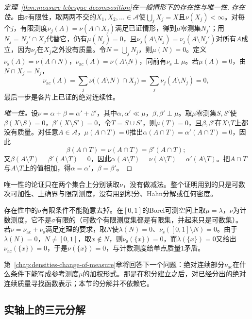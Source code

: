 \begin{proof}[定理~\ref{thm:measure-lebesgue-decomposition}在一般情形下的存在性与唯一性]
\emph{存在性。}由$\sigma$有限性，取两两不交的$X_1,X_2,\dots\in\mathcal A$使$\bigcup_jX_j=X$且$\nu(X_j)<\infty$。对每个$j$，有限测度$\nu_j(A)=\nu(A\cap X_j)$满足已证情形，得到$\mu$零测集$N_j'$；用$N_j=N_j'\cap X_j$代替它，仍有$\mu(N_j)=0$，且$\nu_j(A\setminus N_j)=\nu_j(A\setminus N_j')$对所有$A$成立，因为$\nu_j$在$X_j$之外没有质量。令$N=\bigcup_jN_j$，则$\mu(N)=0$。定义$\nu_{\mathrm{s}}(A)=\nu(A\cap N)$，$\nu_{\mathrm{ac}}(A)=\nu(A\setminus N)$，同前有$\nu_{\mathrm{s}}\perp\mu$。若$\mu(A)=0$，由$N\cap X_j=N_j$，
\[
 \nu_{\mathrm{ac}}(A)=\sum_j\nu\bigl((A\setminus N)\cap X_j\bigr)=\sum_j\nu_j(A\setminus N_j)=0,
\]
最后一步是各片上已证的绝对连续性。

\emph{唯一性。}设$\nu=\alpha+\beta=\alpha'+\beta'$，其中$\alpha,\alpha'\ll\mu$，$\beta,\beta'\perp\mu$。取$\mu$零测集$S,S'$使$\beta(X\setminus S)=0$，$\beta'(X\setminus S')=0$，令$T=S\cup S'$，则$\mu(T)=0$，且$\beta,\beta'$在$X\setminus T$上都没有质量。对任意$A\in\mathcal A$，$\mu(A\cap T)=0$推出$\alpha(A\cap T)=\alpha'(A\cap T)=0$，因此
\[
 \beta(A\cap T)=\nu(A\cap T)=\beta'(A\cap T);
\]
又$\beta(A\setminus T)=\beta'(A\setminus T)=0$，因此$\alpha(A\setminus T)=\nu(A\setminus T)=\alpha'(A\setminus T)$。把$A\cap T$与$A\setminus T$上的值相加，得$\alpha=\alpha'$，$\beta=\beta'$。
\end{proof}

唯一性的论证只在两个集合上分别读取$\nu$，没有做减法。整个证明用到的只是可数次可加性、上确界与限制测度，没有用到积分、Hahn分解或任何密度。

存在性中的$\sigma$有限条件不能随意去掉。在$[0,1]$的Borel可测空间上取$\mu=\lambda$，$\nu$为计数测度，它不是$\sigma$有限的（可数个有限测度集都是有限集，并起来只是可数集）。若$\nu=\nu_{\mathrm{ac}}+\nu_{\mathrm{s}}$满足定理的要求，取$N$使$\lambda(N)=0$、$\nu_{\mathrm{s}}([0,1]\setminus N)=0$。由于$\lambda(N)=0$，$N\ne[0,1]$，取$x\notin N$，则$\nu_{\mathrm{s}}(\{x\})=0$，而$\lambda(\{x\})=0$又给出$\nu_{\mathrm{ac}}(\{x\})=0$，于是$\nu(\{x\})=0$，与计数测度给单点质量$1$矛盾。

第~\ref{chap:densities-change-of-measure}章将回答下一个问题：绝对连续部分$\nu_{\mathrm{ac}}$在什么条件下能写成参考测度$\mu$的加权形式。那是在积分建立之后，对已经分出的绝对连续质量寻找函数表示；本节的分解并不依赖它。

\subsection{实轴上的三元分解}
\label{sec:measure-three-part}


